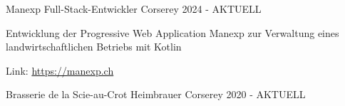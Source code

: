 

\begin{cventries}

    \cventry
    {Manexp} %
    {Full-Stack-Entwickler} %
    {Corserey} %
    {2024 - AKTUELL} %
    {
      \begin{cvitems} %
        \item {Entwicklung der Progressive Web Application Manexp zur Verwaltung eines landwirtschaftlichen Betriebs mit Kotlin}
        \item {Link: \href{https://manexp.ch}{https://manexp.ch}}
      \end{cvitems}
    }

    \cventry
    {Brasserie de la Scie-au-Crot} %
    {Heimbrauer} %
    {Corserey} %
    {2020 - AKTUELL} %
    {}

\end{cventries}
